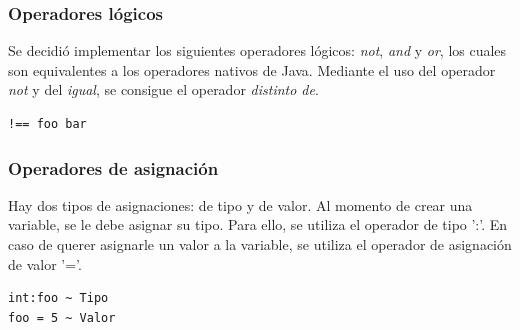 \documentclass[spanish]{article}
\begin{document}
            \subsubsection{Operadores lógicos}
                \par Se decidió implementar los siguientes operadores lógicos: \textit{not}, \textit{and} y \textit{or}, los cuales son equivalentes a los operadores nativos de Java. Mediante el uso del operador \textit{not} y del \textit{igual}, se consigue el operador \textit{distinto de}.
                \begin{lstlisting}
!== foo bar
                \end{lstlisting}
            \subsubsection{Operadores de asignación}
                \par Hay dos tipos de asignaciones: de tipo y de valor. Al momento de crear una variable, se le debe asignar su tipo. Para ello, se utiliza el operador de tipo ':'. En caso de querer asignarle un valor a la variable, se utiliza el operador de asignación de valor '='. 
                \begin{lstlisting}
int:foo ~ Tipo
foo = 5 ~ Valor
                \end{lstlisting}
\end{document}
